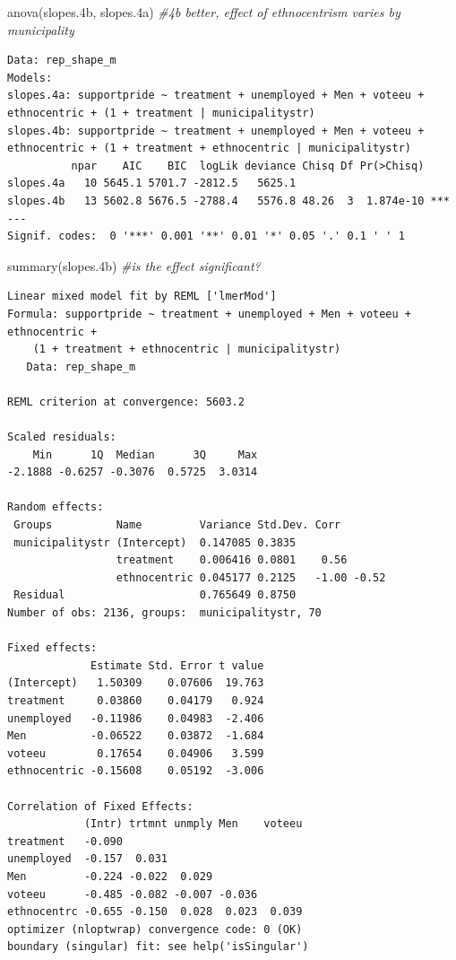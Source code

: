 \documentclass[
]{article}
\newenvironment{Shaded}{\begin{snugshade}}{\end{snugshade}}
\newcommand{\CommentTok}[1]{\textcolor[rgb]{0.56,0.35,0.01}{\textit{#1}}}
\newcommand{\FloatTok}[1]{\textcolor[rgb]{0.00,0.00,0.81}{#1}}
\newcommand{\FunctionTok}[1]{\textcolor[rgb]{0.00,0.00,0.00}{#1}}
\newcommand{\NormalTok}[1]{#1}
\begin{document}
\begin{Shaded}
\begin{Highlighting}[]
\FunctionTok{anova}\NormalTok{(slopes}\FloatTok{.4}\NormalTok{b, slopes}\FloatTok{.4}\NormalTok{a) }\CommentTok{\#4b better, effect of ethnocentrism varies by municipality}
\end{Highlighting}
\end{Shaded}

\begin{verbatim}
Data: rep_shape_m
Models:
slopes.4a: supportpride ~ treatment + unemployed + Men + voteeu + ethnocentric + (1 + treatment | municipalitystr)
slopes.4b: supportpride ~ treatment + unemployed + Men + voteeu + ethnocentric + (1 + treatment + ethnocentric | municipalitystr)
          npar    AIC    BIC  logLik deviance Chisq Df Pr(>Chisq)    
slopes.4a   10 5645.1 5701.7 -2812.5   5625.1                        
slopes.4b   13 5602.8 5676.5 -2788.4   5576.8 48.26  3  1.874e-10 ***
---
Signif. codes:  0 '***' 0.001 '**' 0.01 '*' 0.05 '.' 0.1 ' ' 1
\end{verbatim}

\begin{Shaded}
\begin{Highlighting}[]
\FunctionTok{summary}\NormalTok{(slopes}\FloatTok{.4}\NormalTok{b) }\CommentTok{\#is the effect significant?}
\end{Highlighting}
\end{Shaded}

\begin{verbatim}
Linear mixed model fit by REML ['lmerMod']
Formula: supportpride ~ treatment + unemployed + Men + voteeu + ethnocentric +  
    (1 + treatment + ethnocentric | municipalitystr)
   Data: rep_shape_m

REML criterion at convergence: 5603.2

Scaled residuals: 
    Min      1Q  Median      3Q     Max 
-2.1888 -0.6257 -0.3076  0.5725  3.0314 

Random effects:
 Groups          Name         Variance Std.Dev. Corr       
 municipalitystr (Intercept)  0.147085 0.3835              
                 treatment    0.006416 0.0801    0.56      
                 ethnocentric 0.045177 0.2125   -1.00 -0.52
 Residual                     0.765649 0.8750              
Number of obs: 2136, groups:  municipalitystr, 70

Fixed effects:
             Estimate Std. Error t value
(Intercept)   1.50309    0.07606  19.763
treatment     0.03860    0.04179   0.924
unemployed   -0.11986    0.04983  -2.406
Men          -0.06522    0.03872  -1.684
voteeu        0.17654    0.04906   3.599
ethnocentric -0.15608    0.05192  -3.006

Correlation of Fixed Effects:
            (Intr) trtmnt unmply Men    voteeu
treatment   -0.090                            
unemployed  -0.157  0.031                     
Men         -0.224 -0.022  0.029              
voteeu      -0.485 -0.082 -0.007 -0.036       
ethnocentrc -0.655 -0.150  0.028  0.023  0.039
optimizer (nloptwrap) convergence code: 0 (OK)
boundary (singular) fit: see help('isSingular')
\end{verbatim}
\end{document}
